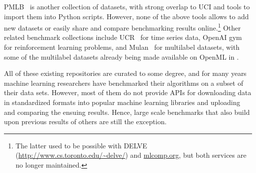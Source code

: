\documentclass[twoside,11pt]{article}
\begin{document}

PMLB~\citep{pmlb} is another collection of datasets, with strong overlap to UCI and tools to import them into Python scripts.
However, none of the above tools allows to add new datasets or easily share and compare benchmarking results online.\footnote{The latter used to be possible with DELVE (\url{http://www.cs.toronto.edu/~delve/}) and \url{mlcomp.org}, but both services are no longer maintained.}
Other related benchmark collections include UCR~\citep{UCRArchive} for time series data, OpenAI gym~\citep{openai_gym} for reinforcement learning problems, and Mulan~\citep{mulan} for multilabel datasets, with some of the multilabel datasets already being made available on OpenML in \cite{Probst2017}.

All of these existing repositories are 
curated to some degree, and for many years machine learning researchers have benchmarked their algorithms on a subset of their data sets.
However, most of them do not provide APIs for downloading data in standardized formats into popular machine learning libraries and uploading and comparing the ensuing results. Hence, large scale benchmarks that also build upon previous results of others are still the exception. 
\end{document}
